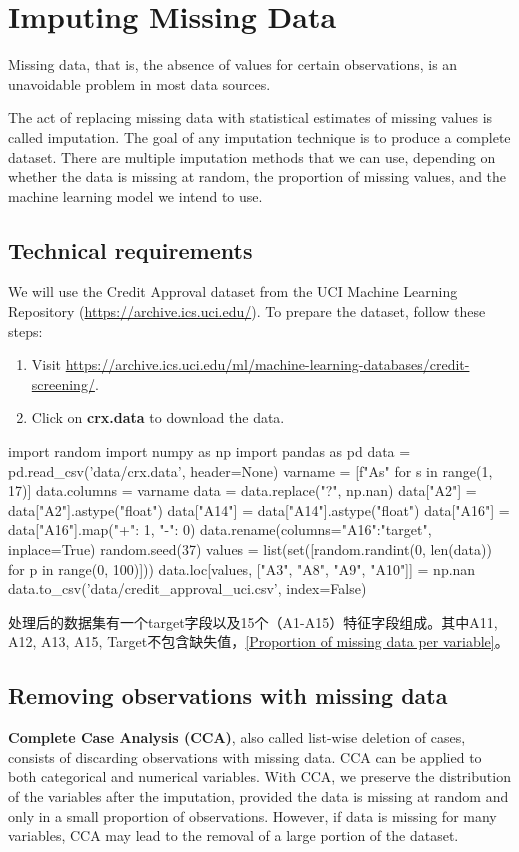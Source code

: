 \chapter{Imputing Missing Data}
Missing data, that is, the absence of values for certain observations, is an unavoidable problem in most data sources.

The act of replacing missing data with statistical estimates of missing values is called imputation.
The goal of any imputation technique is to produce a complete dataset. There are multiple imputation
methods that we can use, depending on whether the data is missing at random, the proportion of
missing values, and the machine learning model we intend to use.

\section{Technical requirements\label{credit_approval_uci}}
We will use the Credit Approval dataset from the UCI Machine Learning Repository (\url{https://archive.ics.uci.edu/}). To prepare the dataset, follow these steps:
\begin{enumerate}
    \item Visit \url{https://archive.ics.uci.edu/ml/machine-learning-databases/credit-screening/}.
    \item Click on \textbf{crx.data} to download the data.
\end{enumerate}
\begin{pyc}
import random
import numpy as np
import pandas as pd
data = pd.read_csv('data/crx.data', header=None)
varname = [f"A{s}" for s in range(1, 17)]
data.columns = varname
data = data.replace("?", np.nan)
data["A2"] = data["A2"].astype("float")
data["A14"] = data["A14"].astype("float")
data["A16"] = data["A16"].map({"+": 1, "-": 0})
data.rename(columns={"A16":"target"}, inplace=True)
random.seed(37)
values = list(set([random.randint(0, len(data)) for p in range(0, 100)]))
data.loc[values, ["A3", "A8", "A9", "A10"]] = np.nan
data.to_csv('data/credit_approval_uci.csv', index=False)
\end{pyc}


处理后的数据集有一个target字段以及15个（A1-A15）特征字段组成。其中A11, A12, A13, A15, Target不包含缺失值，\autoref{Proportion of missing data per variable}。

\section{Removing observations with missing data}
\textbf{Complete Case Analysis (CCA)}, also called list-wise deletion of cases, consists of discarding observations
with missing data. CCA can be applied to both categorical and numerical variables. With CCA, we
preserve the distribution of the variables after the imputation, provided the data is missing at random
and only in a small proportion of observations. However, if data is missing for many variables, CCA
may lead to the removal of a large portion of the dataset.
